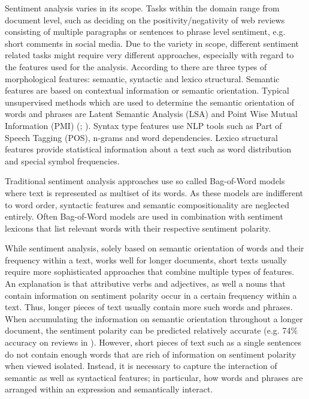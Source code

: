 \documentclass[a4paper,12pt]{article}%
\begin{document}
Sentiment analysis varies in its scope. Tasks within the domain range from document level, such as deciding on the positivity/negativity of web reviews consisting of multiple paragraphs or sentences to phrase level sentiment, e.g. short comments in social media. Due to the variety in scope, different sentiment related tasks might require very different approaches, especially with regard to the features used for the analysis. According to \citet{Asghar2014} there are three types of morphological features: semantic,  syntactic and lexico structural. Semantic features are based on contextual information or semantic orientation. Typical unsupervised methods which are used to determine the semantic orientation of words and phrases are Latent Semantic Analysis (LSA) and Point Wise Mutual Information (PMI) (\cite{Turney2002}; \cite{Turney2003}). Syntax type features use NLP tools such as Part of Speech Tagging (POS), n-grams and word dependencies. Lexico structural features provide statistical information about a text such as word distribution and special symbol frequencies.


Traditional sentiment analysis approaches use so called Bag-of-Word models where text is represented as multiset of its words. As these models are indifferent to word order, syntactic features and semantic compositionality are neglected entirely. Often Bag-of-Word models are used in combination with sentiment lexicons that list relevant words with their respective sentiment polarity.

While sentiment analysis, solely based on semantic orientation of words and their frequency within a text, works well for longer documents, short texts usually require more sophisticated approaches that combine multiple types of features. An explanation is that attributive verbs and adjectives, as well a nouns that contain information on sentiment polarity occur in a certain frequency within a text. Thus, longer pieces of text usually contain more such words and phrases. When accumulating the information on semantic orientation throughout a longer document, the sentiment polarity can be predicted relatively accurate (e.g. 74\% accuracy on reviews in \citet{Turney2002}). However, short pieces of text such as a single sentences do not contain enough words that are rich of information on sentiment polarity when viewed isolated. Instead, it is necessary to capture the interaction of semantic as well as syntactical features; in particular, how words and phrases are arranged within an expression and semantically interact.\\
\end{document}
